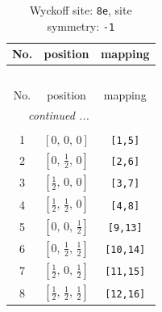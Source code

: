 \documentclass[fleqn,8pt]{jsarticle}
\begin{document}
\renewcommand{\arraystretch}{1.2}
\begin{longtable}{ccc}
\caption{Wyckoff site: {\tt 8e}, site symmetry: {\tt -1}}
 \\
 \hline \hline
No. & position & mapping \\ \hline \endfirsthead

\multicolumn{2}{l}{\tablename\ \thetable{}} \\
 \hline \hline
No. & position & mapping \\ \hline \endhead

 \hline \hline
\multicolumn{2}{r}{\footnotesize\it continued ...} \\ \endfoot

 \hline \hline
\multicolumn{2}{r}{} \\ \endlastfoot

1 & $\left[ 0,\, 0,\, 0 \right]$ & {\tt [1,5]} \\ \hline
2 & $\left[ 0,\, \frac{1}{2},\, 0 \right]$ & {\tt [2,6]} \\ \hline
3 & $\left[ \frac{1}{2},\, 0,\, 0 \right]$ & {\tt [3,7]} \\ \hline
4 & $\left[ \frac{1}{2},\, \frac{1}{2},\, 0 \right]$ & {\tt [4,8]} \\ \hline
5 & $\left[ 0,\, 0,\, \frac{1}{2} \right]$ & {\tt [9,13]} \\ \hline
6 & $\left[ 0,\, \frac{1}{2},\, \frac{1}{2} \right]$ & {\tt [10,14]} \\ \hline
7 & $\left[ \frac{1}{2},\, 0,\, \frac{1}{2} \right]$ & {\tt [11,15]} \\ \hline
8 & $\left[ \frac{1}{2},\, \frac{1}{2},\, \frac{1}{2} \right]$ & {\tt [12,16]} \\
\end{longtable}
\renewcommand{\arraystretch}{1.2}
\end{document}
